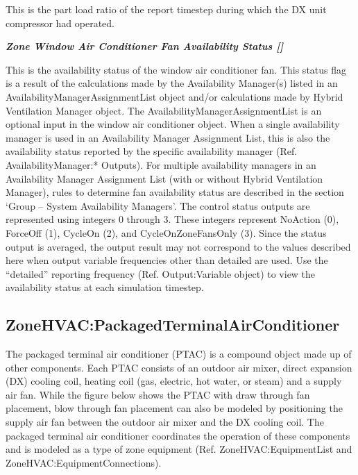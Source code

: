 This is the part load ratio of the report timestep during which the DX unit compressor had operated.

\textbf{\emph{Zone Window Air Conditioner Fan Availability Status {[]}}}

This is the availability status of the window air conditioner fan. This status flag is a result of the calculations made by the Availability Manager(s) listed in an AvailabilityManagerAssignmentList object and/or calculations made by Hybrid Ventilation Manager object. The AvailabilityManagerAssignmentList is an optional input in the window air conditioner object. When a single availability manager is used in an Availability Manager Assignment List, this is also the availability status reported by the specific availability manager (Ref. AvailabilityManager:* Outputs). For multiple availability managers in an Availability Manager Assignment List (with or without Hybrid Ventilation Manager), rules to determine fan availability status are described in the section `Group -- System Availability Managers'. The control status outputs are represented using integers 0 through 3. These integers represent NoAction (0), ForceOff (1), CycleOn (2), and CycleOnZoneFansOnly (3). Since the status output is averaged, the output result may not correspond to the values described here when output variable frequencies other than detailed are used. Use the ``detailed'' reporting frequency (Ref. Output:Variable object) to view the availability status at each simulation timestep.

\subsection{ZoneHVAC:PackagedTerminalAirConditioner}\label{zonehvacpackagedterminalairconditioner}

The packaged terminal air conditioner (PTAC) is a compound object made up of other components. Each PTAC consists of an outdoor air mixer, direct expansion (DX) cooling coil, heating coil (gas, electric, hot water, or steam) and a supply air fan. While the figure below shows the PTAC with draw through fan placement, blow through fan placement can also be modeled by positioning the supply air fan between the outdoor air mixer and the DX cooling coil. The packaged terminal air conditioner coordinates the operation of these components and is modeled as a type of zone equipment (Ref. ZoneHVAC:EquipmentList and ZoneHVAC:EquipmentConnections).

